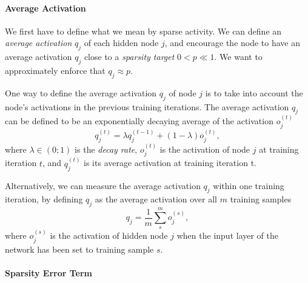 \paragraph{Average Activation}

We first have to define what we mean by sparse activity. We can define
an \emph{average activation} $q_{j}$ of each hidden node $j$, and
encourage the node to have an average activation $q_{j}$ close to
a \emph{sparsity target} $0<p\ll1$. We want
to approximately enforce that $q_{j}\approx p$. 

One way to define the average activation $q_{j}$ of node $j$ is
to take into account the node's activations in the previous training
iterations. The average activation $q_{j}$ can be defined to be an
exponentially decaying average of the activation $o_{j}^{(t)}$
\[
q_{j}^{(t)}=\lambda q_{j}^{(t-1)}+(1-\lambda)o_{j}^{(t)},
\]
 where $\lambda\in(0;1)$ is the \emph{decay rate},
$o_{j}^{(t)}$ is the activation of node $j$ at training iteration
$t$, and $q_{j}^{(t)}$ is its average activation at training iteration
t.

Alternatively, we can measure the average activation $q_{j}$ within
one training iteration, by defining $q_{j}$ as the average activation
over all $m$ training samples
\[
q_{j}=\frac{1}{m}\sum_{s}^{m}o_{j}^{(s)},
\]
 where $o_{j}^{(s)}$ is the activation of hidden node $j$ when the
input layer of the network has been set to training sample $s$.

\paragraph{Sparsity Error Term}


